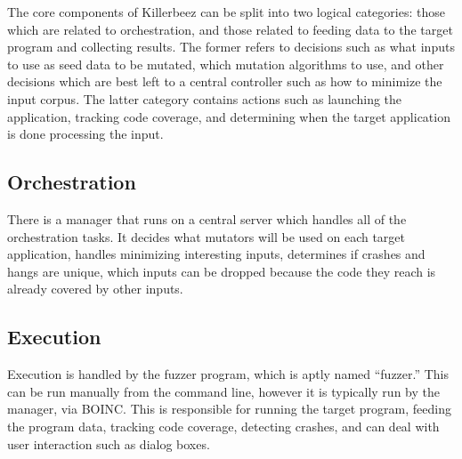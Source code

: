 The core components of Killerbeez can be split into two logical categories:
those which are related to orchestration, and those related to feeding data
to the target program and collecting results.  The former refers to decisions
such as what inputs to use as seed data to be mutated, which mutation
algorithms to use, and other decisions which are best left to a central
controller such as how to minimize the input corpus.  The latter category
contains actions such as launching the application, tracking code coverage,
and determining when the target application is done processing the input.

\subsection{Orchestration}
There is a manager that runs on a central server which handles all of the
orchestration tasks.  It decides what mutators will be used on each target
application, handles minimizing interesting inputs, determines if crashes
and hangs are unique, which inputs can be dropped because the code they
reach is already covered by other inputs.

\subsection{Execution}
Execution is handled by the fuzzer program, which is aptly named ``fuzzer.''
This can be run manually from the command line, however it is typically run by
the manager, via BOINC.  This is responsible for running the target program,
feeding the program data, tracking code coverage, detecting crashes, and can
deal with user interaction such as dialog boxes.

